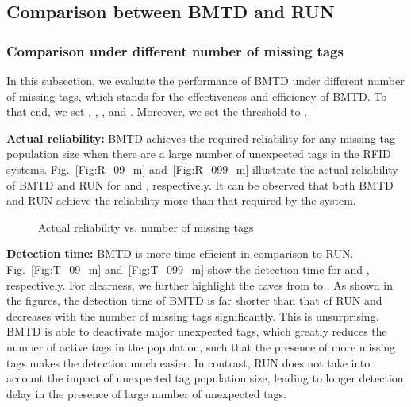 \documentclass[10pt, twocolumn]{IEEEtran}
\begin{document}
\subsection{Comparison between BMTD and RUN}

\subsubsection{Comparison under different number of missing tags}

In this subsection, we evaluate the performance of BMTD under different number of missing tags, which stands for the effectiveness and efficiency of BMTD. To that end, we set , , ,  and . Moreover, we set the threshold to .

\textbf{Actual reliability:}
BMTD achieves the required reliability for any missing tag population size when there are a large number of unexpected tags in the RFID systems.
Fig.~\ref{Fig:R_09_m} and~\ref{Fig:R_099_m} illustrate the actual reliability of BMTD and RUN for  and , respectively. It can be observed that both BMTD and RUN achieve the reliability more than that required by the system.

\begin{figure}[htbp]
\centering
{}
\caption{Actual reliability vs. number of missing tags}
\label{Fig:R_m}
\end{figure}

\textbf{Detection time:}
BMTD is more time-efficient in comparison to RUN.
Fig.~\ref{Fig:T_09_m} and~\ref{Fig:T_099_m} show the detection time for  and , respectively. For clearness, we further highlight the caves from  to .
As shown in the figures, the detection time of BMTD is far shorter than that of RUN and decreases with the number of missing tags significantly. This is unsurprising. BMTD is able to deactivate major unexpected tags, which greatly reduces the number of active tags in the population, such that the presence of more missing tags makes the detection much easier. In contrast, RUN does not take into account the impact of unexpected tag population size, leading to longer detection delay in the presence of large number of unexpected tags.
\end{document}
